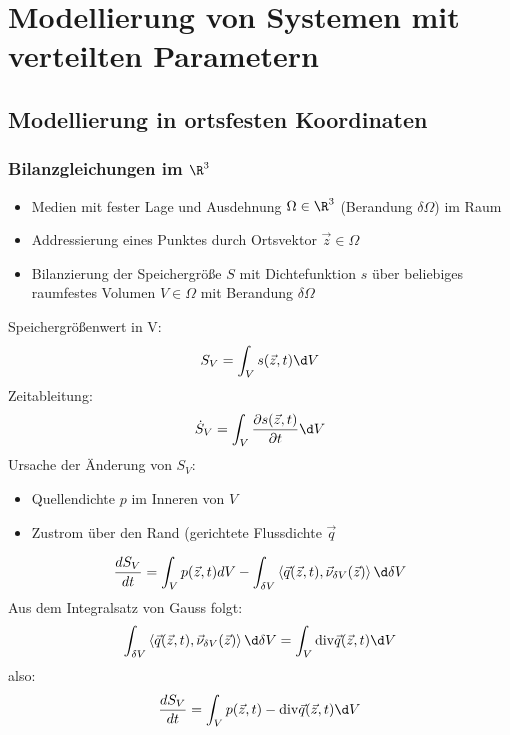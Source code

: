 \newpage
\section{Modellierung von Systemen mit verteilten Parametern}
\subsection{Modellierung in ortsfesten Koordinaten}
\label{sec:modortsfest}
\subsubsection{Bilanzgleichungen im $\R^3$}
\begin{itemize}
\item Medien mit fester Lage und Ausdehnung $\Omega \in \R^3$ (Berandung $\delta \Omega$) im Raum
\item Addressierung eines Punktes durch Ortsvektor $\vec{z}\in \Omega$
\item Bilanzierung der Speichergröße $S$ mit Dichtefunktion $s$ über beliebiges raumfestes Volumen $V \in \Omega$ mit Berandung $\delta \Omega$
\end{itemize}
Speichergrößenwert in V:
\begin{align}
\label{eq:speichergroesse}
S_V = \int_V s(\vec{z},t) \d V
\end{align}
Zeitableitung:
\begin{align}
\label{eq:diffspeichergroesse}
\dot{S}_V = \int_V \frac{\partial s(\vec{z},t)}{\partial t}\d V
\end{align}
Ursache der Änderung von $S_V$:
\begin{itemize}
\item Quellendichte $p$ im Inneren von $V$
\item Zustrom über den Rand (gerichtete Flussdichte $\vec{q}$
\end{itemize}
 \begin{align}
 \label{eq:ursache}
 \frac{dS_V}{dt} = \int_V p(\vec{z},t)dV - \int_{\delta V} \left\langle  \vec{q}(\vec{z},t),\vec{\nu}_{\delta V}(\vec{z})\right\rangle \d  \delta V
 \end{align}
Aus dem Integralsatz von Gauss folgt:
 \begin{align}
 \label{eq:satzvongauss}
  \int_{\delta V} \left\langle  \vec{q}(\vec{z},t),\vec{\nu}_{\delta V}(\vec{z})\right\rangle \d \delta V = \int_V \mathrm{div} \vec{q}(\vec{z},t) \d V
 \end{align}
 also:
 \begin{align*}
 \frac{dS_V}{dt} = \int_V p(\vec{z},t) - \mathrm{div} \vec{q}(\vec{z},t) \d V
 \end{align*}
